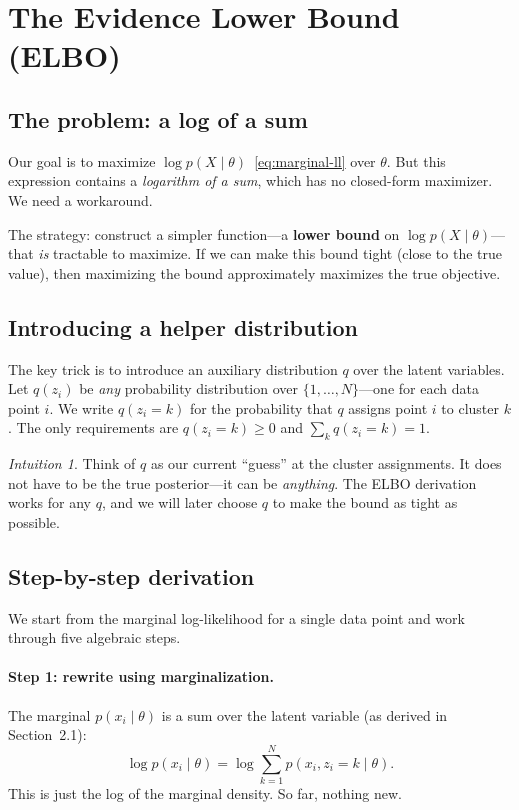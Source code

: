 \documentclass[11pt]{article}
\theoremstyle{definition}
\theoremstyle{plain}
\theoremstyle{remark}
\newtheorem{intuition}{Intuition}[section]
\begin{document}
\section{The Evidence Lower Bound (ELBO)}

\subsection{The problem: a log of a sum}

Our goal is to maximize $\log p(X\mid\theta)$~\eqref{eq:marginal-ll} over $\theta$. But this expression contains a \emph{logarithm of a sum}, which has no closed-form maximizer. We need a workaround.

The strategy: construct a simpler function---a \textbf{lower bound} on $\log p(X\mid\theta)$---that \emph{is} tractable to maximize. If we can make this bound tight (close to the true value), then maximizing the bound approximately maximizes the true objective.

\subsection{Introducing a helper distribution}

The key trick is to introduce an auxiliary distribution $q$ over the latent variables. Let $q(z_i)$ be \emph{any} probability distribution over $\{1,\dots,N\}$---one for each data point $i$. We write $q(z_i=k)$ for the probability that $q$ assigns point $i$ to cluster $k$. The only requirements are $q(z_i=k)\geq 0$ and $\sum_k q(z_i=k)=1$.

\begin{intuition}
Think of $q$ as our current ``guess'' at the cluster assignments. It does not have to be the true posterior---it can be \emph{anything}. The ELBO derivation works for any $q$, and we will later choose $q$ to make the bound as tight as possible.
\end{intuition}

\subsection{Step-by-step derivation}

We start from the marginal log-likelihood for a single data point and work through five algebraic steps.

\paragraph{Step 1: rewrite using marginalization.} The marginal $p(x_i\mid\theta)$ is a sum over the latent variable (as derived in Section~2.1):
\begin{equation}
  \log p(x_i\mid\theta) = \log\sum_{k=1}^N p(x_i,z_i=k\mid\theta).
  \label{eq:elbo-step1}
\end{equation}
This is just the log of the marginal density. So far, nothing new.
\end{document}
